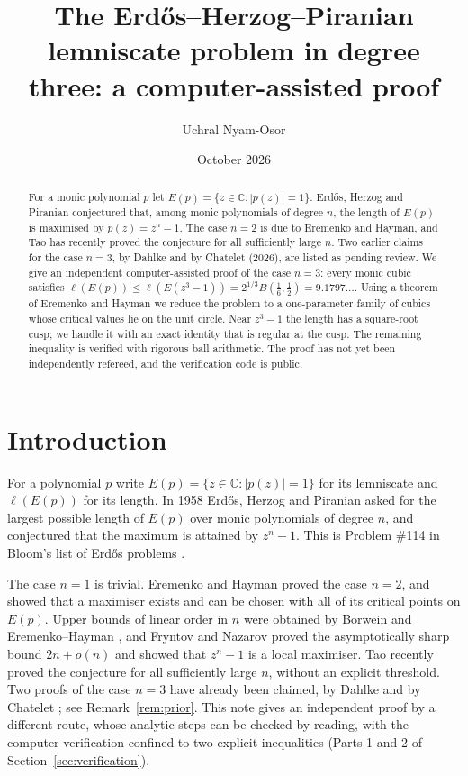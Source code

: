 \documentclass[11pt]{amsart}
\title[The Erd\H{o}s--Herzog--Piranian lemniscate problem in degree three]{The Erd\H{o}s--Herzog--Piranian lemniscate problem in degree three: a computer-assisted proof}
\author{Uchral Nyam-Osor}
\date{October 2026}
\theoremstyle{remark}
\newcommand{\C}{\mathbb{C}}
\begin{document}
\sloppy

\begin{abstract}
For a monic polynomial $p$ let $E(p)=\{z\in\C:|p(z)|=1\}$. Erd\H{o}s, Herzog and Piranian conjectured that, among monic polynomials of degree $n$, the length of $E(p)$ is maximised by $p(z)=z^n-1$. The case $n=2$ is due to Eremenko and Hayman, and Tao has recently proved the conjecture for all sufficiently large $n$. Two earlier claims for the case $n=3$, by Dahlke and by Chatelet (2026), are listed as pending review. We give an independent computer-assisted proof of the case $n=3$: every monic cubic satisfies $\ell(E(p))\le \ell(E(z^3-1))=2^{1/3}B(\tfrac16,\tfrac12)=9.1797\ldots$. Using a theorem of Eremenko and Hayman we reduce the problem to a one-parameter family of cubics whose critical values lie on the unit circle. Near $z^3-1$ the length has a square-root cusp; we handle it with an exact identity that is regular at the cusp. The remaining inequality is verified with rigorous ball arithmetic. The proof has not yet been independently refereed, and the verification code is public.
\end{abstract}

\maketitle
\pagestyle{plain}

\section{Introduction}

For a polynomial $p$ write $E(p)=\{z\in\C:|p(z)|=1\}$ for its lemniscate and $\ell(E(p))$ for its length. In 1958 Erd\H{o}s, Herzog and Piranian \cite{EHP} asked for the largest possible length of $E(p)$ over monic polynomials of degree $n$, and conjectured that the maximum is attained by $z^n-1$. This is Problem \#114 in Bloom's list of Erd\H{o}s problems \cite{EP}.

The case $n=1$ is trivial. Eremenko and Hayman \cite{EH} proved the case $n=2$, and showed that a maximiser exists and can be chosen with all of its critical points on $E(p)$. Upper bounds of linear order in $n$ were obtained by Borwein \cite{Bor} and Eremenko--Hayman \cite{EH}, and Fryntov and Nazarov \cite{FN} proved the asymptotically sharp bound $2n+o(n)$ and showed that $z^n-1$ is a local maximiser. Tao \cite{Tao} recently proved the conjecture for all sufficiently large $n$, without an explicit threshold. Two proofs of the case $n=3$ have already been claimed, by Dahlke \cite{Dah} and by Chatelet \cite{Cha}; see Remark~\ref{rem:prior}. This note gives an independent proof by a different route, whose analytic steps can be checked by reading, with the computer verification confined to two explicit inequalities (Parts 1 and 2 of Section~\ref{sec:verification}).
\end{document}

